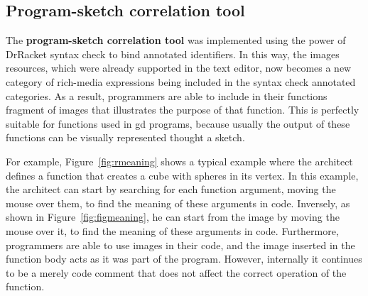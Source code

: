 \subsection{Program-sketch correlation tool}

The \textbf{program-sketch correlation tool} was implemented using the power of DrRacket syntax check to bind annotated identifiers. In this way, the images resources, which were already supported in the text editor, now becomes a new category of rich-media expressions being included in the syntax check annotated categories. As a result, programmers are able to include in their functions fragment of images that illustrates the purpose of that function. This is perfectly suitable for functions used in \gls{gd} programs, because usually the output of these functions can be visually represented thought a sketch.

For example, Figure~\ref{fig:rmeaning} shows a typical example where the architect defines a function that creates a cube with spheres in its vertex. In this example, the architect can start by searching for each function argument, moving the mouse over them, to find the meaning of these arguments in code. Inversely, as shown in Figure~\ref{fig:figmeaning}, he can start from the image by moving the mouse over it, to find the meaning of these arguments in code. Furthermore, programmers are able to use images in their code, and the image inserted in the function body acts as it was part of the program. However, internally it continues to be a merely code comment that does not affect the correct operation of the function.    

